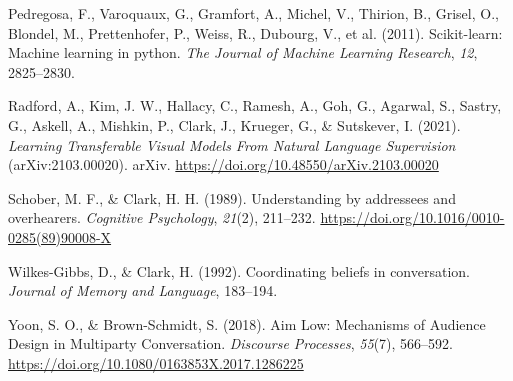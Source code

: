 \documentclass[10pt, letterpaper]{article}
\begin{document}
\begin{CSLReferences}{1}{0}
Pedregosa, F., Varoquaux, G., Gramfort, A., Michel, V., Thirion, B.,
Grisel, O., Blondel, M., Prettenhofer, P., Weiss, R., Dubourg, V., et
al. (2011). Scikit-learn: {Machine} learning in python. \emph{The
Journal of Machine Learning Research}, \emph{12}, 2825--2830.

Radford, A., Kim, J. W., Hallacy, C., Ramesh, A., Goh, G., Agarwal, S.,
Sastry, G., Askell, A., Mishkin, P., Clark, J., Krueger, G., \&
Sutskever, I. (2021). \emph{Learning {Transferable Visual Models From
Natural Language Supervision}} (arXiv:2103.00020). arXiv.
\url{https://doi.org/10.48550/arXiv.2103.00020}

Schober, M. F., \& Clark, H. H. (1989). Understanding by addressees and
overhearers. \emph{Cognitive Psychology}, \emph{21}(2), 211--232.
\url{https://doi.org/10.1016/0010-0285(89)90008-X}

Wilkes-Gibbs, D., \& Clark, H. (1992). Coordinating beliefs in
conversation. \emph{Journal of Memory and Language}, 183--194.

Yoon, S. O., \& Brown-Schmidt, S. (2018). Aim {Low}: {Mechanisms} of
{Audience Design} in {Multiparty Conversation}. \emph{Discourse
Processes}, \emph{55}(7), 566--592.
\url{https://doi.org/10.1080/0163853X.2017.1286225}

\end{CSLReferences}


\end{document}

